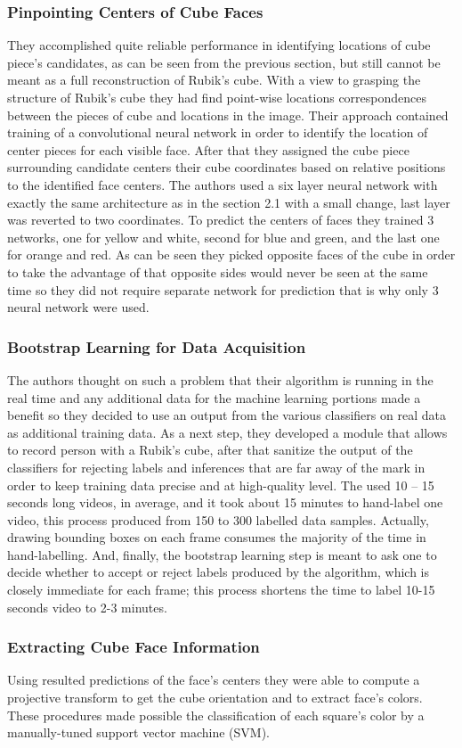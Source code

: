 \documentclass[../../main]{subfiles}
\begin{document}
\subsubsection{Pinpointing Centers of Cube Faces}
They accomplished quite reliable performance in identifying locations of cube piece’s candidates, as can be seen from the previous section, but still cannot be meant as a full reconstruction of Rubik’s cube. With a view to grasping the structure of Rubik’s cube they had find point-wise locations correspondences between the pieces of cube and locations in the image. Their approach contained training of a convolutional neural network in order to identify the location of center pieces for each visible face. After that they assigned the cube piece surrounding candidate centers their cube coordinates based on relative positions to the identified face centers. The authors used a six layer neural network with exactly the same architecture as in the section 2.1 with a small change, last layer was reverted to two coordinates. To predict the centers of faces they trained 3 networks, one for yellow and white, second for blue and green, and the last one for orange and red. As can be seen they picked opposite faces of the cube in order to take the advantage of that opposite sides would never be seen at the same time so they did not require separate network for prediction that is why only 3 neural network were used.

\subsubsection{Bootstrap Learning for Data Acquisition}
The authors thought on such a problem that their algorithm is running in the real time and any additional data for the machine learning portions made a benefit so they decided to use an output from the various classifiers on real data as additional training data. As a next step, they developed a module that allows to record person with a Rubik’s cube, after that sanitize the output of the classifiers for rejecting labels and inferences that are far away of the mark in order to keep training data precise and at high-quality level. The used 10 – 15 seconds long videos, in average, and it took about 15 minutes to hand-label one video, this process produced from 150 to 300 labelled data samples. Actually, drawing bounding boxes on each frame consumes the majority of the time in hand-labelling. And, finally, the bootstrap learning step is meant to ask one to decide whether to accept or reject labels produced by the algorithm, which is closely immediate for each frame; this process shortens the time to label 10-15 seconds video to 2-3 minutes.

\subsubsection{Extracting Cube Face Information}
Using resulted predictions of the face’s centers they were able to compute a projective transform to get the cube orientation and to extract face’s colors. These procedures made possible the classification of each square’s color by a manually-tuned support vector machine (SVM).
\end{document}

